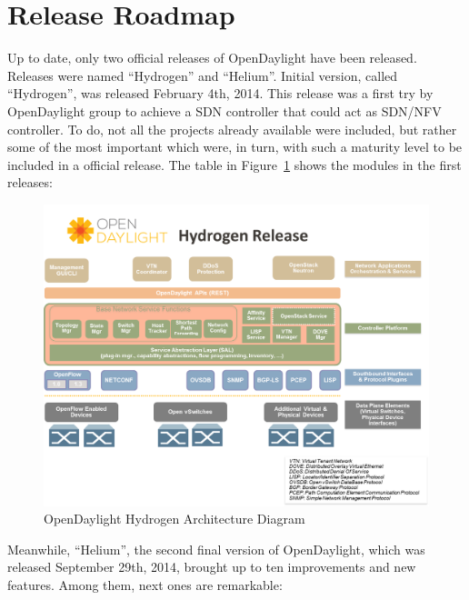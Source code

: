 \documentclass[a4paper, 12pt]{book}
\begin{document}
\section{Release Roadmap}
\label{chap:odl_release_roadmap}

Up to date, only two official releases of OpenDaylight have been released. Releases were named ``Hydrogen'' and ``Helium''. Initial version, called ``Hydrogen'', was released February 4th, 2014. This release was a first try by OpenDaylight group to achieve a SDN controller that could act as SDN/NFV controller. To do, not all the projects already available were included, but rather some of the most important which were, in turn, with such a maturity level to be included in a official release. The table in Figure~\ref{fig:odl_tech_diagram} shows the modules in the first releases:
\begin{center}
 \begin{figure}
 \begin{center}
   \includegraphics[width=15cm]{img/odl-technologies-00.png}
   \caption{OpenDaylight Hydrogen Architecture Diagram}
   \label{fig:odl_tech_diagram}
 \end{center}
 \end{figure}
\end{center}
Meanwhile, ``Helium'', the second final version of OpenDaylight, which was released September 29th, 2014, brought up to ten improvements and new features. Among them, next ones are remarkable:
\end{document}
